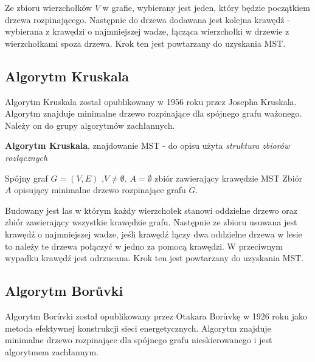 \documentclass[a4paper, 10pt]{article}
\begin{document}
 Ze zbioru wierzchołków $V$ w grafie, wybierany jest jeden, który będzie początkiem drzewa rozpinającego. Następnie do drzewa dodawana jest   
kolejna krawędź - wybierana z krawędzi o najmniejszej wadze, łącząca wierzchołki w drzewie z wierzchołkami spoza drzewa. Krok ten jest powtarzany do uzyskania MST.

	
	\subsection{Algorytm Kruskala}
	

Algorytm Kruskala został opublikowany w 1956 roku przez Josepha Kruskala. Algorytm znajduje minimalne drzewo rozpinające dla spójnego grafu ważonego. Należy
on do grupy algorytmów zachłannych. 

\begin{algorithm}
\caption{{\bf Algorytm Kruskala}, znajdowanie MST - do opisu użyta \textit{struktura zbiorów rozłącznych}}
\begin{algorithmic}[!h]
\REQUIRE Spójny graf $G=(V,E)$ ,$V \neq \emptyset$. 
\ENSURE $A=\emptyset$ zbiór zawierający krawędzie MST
\ENDFOR 
{}
\ENDIF
\ENDFOR 
\RETURN Zbiór $A$ opisujący minimalne drzewo rozpinające grafu $G$.
\end{algorithmic}
\end{algorithm}
\FloatBarrier

Budowany jest las w którym każdy wierzchołek stanowi oddzielne drzewo oraz zbiór zawierający wszystkie krawędzie grafu.
Następnie ze zbioru usuwana jest krawędź o najmniejszej wadze, jeśli krawędź łączy dwa oddzielne drzewa w lesie	to należy te drzewa połączyć w jedno za pomocą
krawędzi. W przeciwnym wypadku krawędź jest odrzucana. Krok ten jest powtarzany do uzyskania MST.

	\subsection{Algorytm Borůvki}
	

Algorytm Borůvki został opublikowany przez Otakara Borůvkę w 1926 roku jako metoda efektywnej konstrukcji sieci 
energetycznych. Algorytm znajduje minimalne drzewo rozpinające dla spójnego grafu nieskierowanego i jest algorytmem zachłannym.
\end{document}
